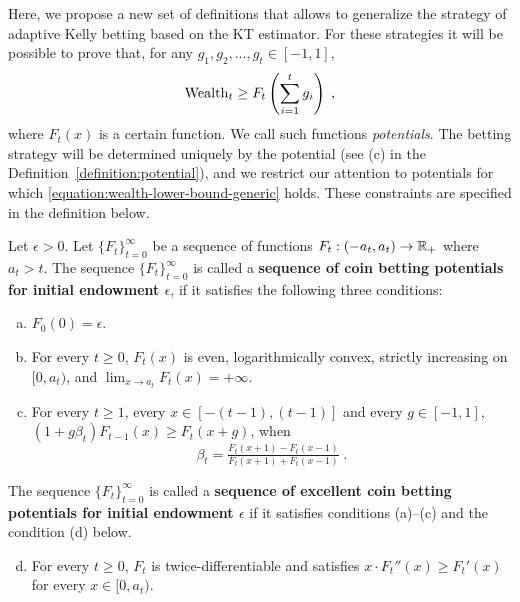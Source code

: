 Here, we propose a new set of definitions that allows to generalize the
strategy of adaptive Kelly betting based on the KT estimator. For these strategies
it will be possible to prove that, for any $g_1, g_2, \dots, g_t \in [-1,1]$,
\vspace{-0.3cm}
\begin{equation}
\label{equation:wealth-lower-bound-generic}
\operatorname{Wealth}_t \ge F_t \left( \sum_{i=1}^t g_i \right) \; ,
\end{equation}
where $F_t(x)$ is a certain function. We call such functions \emph{potentials}.
The betting strategy will be determined uniquely by the potential (see (c) in
the Definition~\ref{definition:potential}), and we restrict our attention to
potentials for which \eqref{equation:wealth-lower-bound-generic} holds. These
constraints are specified in the definition below.
\begin{definition}
\label{definition:potential}
Let $\epsilon > 0$. Let $\{F_t\}_{t=0}^\infty$ be a sequence of functions
$F_t:(-a_t, a_t)  \to \mathbb{R}_+$ where $a_t > t$.  The sequence
$\{F_t\}_{t=0}^\infty$ is called a \textbf{sequence of coin betting potentials
for initial endowment $\epsilon$}, if it satisfies the following three
conditions:
\begin{enumerate}[(a)]
\item $F_0(0) = \epsilon$.

\item For every $t \ge 0$, $F_t(x)$ is even, logarithmically convex, strictly
increasing on $[0,a_t)$, and
$\lim_{x \to a_t} F_t(x) = +\infty$.
\item For every $t \ge 1$, every $x \in [-(t-1), (t-1)]$ and every $g \in [-1,1]$, $\left(1 + g \beta_t \right) F_{t-1}(x) \ge F_t(x+g)$, when
\begin{equation}
\label{equation:potential-based-strategy}
\beta_t=\tfrac{F_t(x + 1) - F_t(x - 1)}{F_t(x + 1) + F_t(x - 1)} \;.
\end{equation}
\end{enumerate}
The sequence $\{F_t\}_{t=0}^\infty$ is called a
\textbf{sequence of excellent coin betting potentials for initial
endowment $\epsilon$} if it satisfies conditions (a)--(c) and the condition (d)
below.
\begin{enumerate}[(a)]
\setcounter{enumi}{3}
\item For every $t \ge 0$, $F_t$ is twice-differentiable and
satisfies $x \cdot F_t''(x) \ge F_t'(x)$ for every $x \in [0,a_t)$.
\end{enumerate}
\end{definition}

